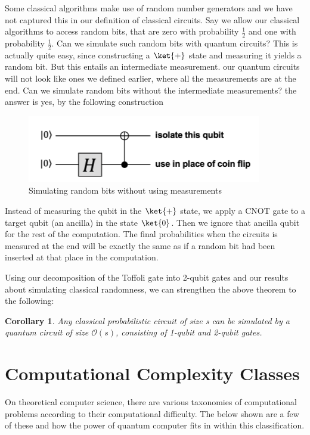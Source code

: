 \documentclass[12pt, oneside]{book}
\newtheorem{corollary}[theorem]{Corollary}
\theoremstyle{definition}
\theoremstyle{definition}
\theoremstyle{remark}
\begin{document}
Some classical algorithms make use of random number generators and we have not captured this in our definition of classical circuits. Say we allow our classical algorithms to access random bits, that are zero with probability $\frac{1}{2}$ and one with probability $\frac{1}{2}$. Can we simulate such random bits with quantum circuits? This is actually quite easy, since constructing a $\ket{+}$ state and measuring it yields a random bit. But this entails an intermediate measurement. our quantum circuits will not look like ones we defined earlier, where all the measurements are at the end. Can we simulate random bits without the intermediate measurements? the answer is yes, by the following construction
\begin{figure}[H]
    \centering
    \includegraphics[width=0.5\linewidth]{../images/randbit_sim.png}
    \caption{Simulating random bits without using measurements}
    \label{fig:randbit_sim}
\end{figure}
Instead of measuring the qubit in the $\ket{+}$ state, we apply a CNOT gate to a target qubit (an ancilla) in the state $\ket{0}$. Then we ignore that ancilla qubit for the rest of the computation. The final probabilities when the circuits is measured at the end will be exactly the same as if a random bit had been inserted at that place in the computation.

Using our decomposition of the Toffoli gate into 2-qubit gates and our results about simulating classical randomness, we can strengthen the above theorem to the following:
\begin{corollary}
    Any classical probabilistic circuit of size s can be simulated by a quantum circuit of size $\mathcal{O}(s)$, consisting of 1-qubit and 2-qubit gates.
\end{corollary}

\section{Computational Complexity Classes}
On theoretical computer science, there are various taxonomies of computational problems according to their computational difficulty. The below shown are a few of these and how the power of quantum computer fits in within this classification.
\end{document}
